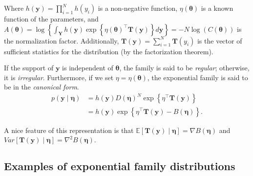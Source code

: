 Where \( h(\bm{y}) = \prod_{i=1}^N h(y_i) \) is a non-negative function, \( \eta(\bm{\theta}) \) is a known function of the parameters, and \( A(\bm{\theta}) = \log\left\{ \int_{\bm{Y}} h(\bm{y}) \exp\left\{ \eta(\bm{\theta})^{\top} \bm{T}(\bm{y}) \right\} d\bm{y} \right\} = -N \log\left(C(\bm{\theta})\right) \) is the normalization factor. Additionally, \( \bm{T}(\bm{y}) = \sum_{i=1}^N \bm{T}(y_i) \) is the vector of sufficient statistics for the distribution (by the factorization theorem).

If the support of \( \bm{y} \) is independent of \( \bm{\theta} \), the family is said to be \textit{regular}; otherwise, it is \textit{irregular}. Furthermore, if we set \( \eta = \eta(\bm{\theta}) \), the exponential family is said to be in the \textit{canonical form}.
\begin{align}
	p(\bm{y}\mid \bm{\eta})&=h(\bm{y})D(\bm{\eta})^N\exp\left\{\eta^{\top}\bm{T}(\bm{y})\right\}\nonumber\\
	&=h(\bm{y})\exp\left\{\eta^{\top}\bm{T}(\bm{y})-B(\bm{\eta})\right\}.\nonumber
\end{align}

A nice feature of this representation is that $\mathbb{E}[\bm{T}(\bm{y})\mid \bm{\eta}]=\nabla B(\bm{\eta})$ and $Var[\bm{T}(\bm{y})\mid \bm{\eta}]=\nabla^2 B(\bm{\eta})$. 

\subsection{Examples of exponential family distributions}

